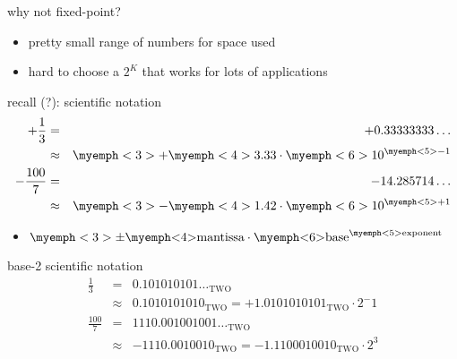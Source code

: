 \begin{frame}{why not fixed-point?}
\begin{itemize}
\item pretty small range of numbers for space used
\item hard to choose a $2^K$ that works for lots of applications
\end{itemize}
\end{frame}

\begin{frame}{recall (?): scientific notation}
\begin{eqnarray*}
+\frac{1}{3} &=& +0.33333333\ldots \\
            &\approx& \myemph<3>{+}\myemph<4>{3.33}\cdot \myemph<6>{10}^{\myemph<5>{-1}} \\
-\frac{100}{7} &=& -14.285714\ldots \\
            &\approx& \myemph<3>{-}\myemph<4>{1.42}\cdot \myemph<6>{10}^{\myemph<5>{+1}} \\
\end{eqnarray*}
\begin{itemize}
\item<2-> $\myemph<3>{\pm}\text{\myemph<4>{mantissa}} \cdot \text{\myemph<6>{base}}^\text{\myemph<5>{exponent}}$
\end{itemize}
\end{frame}

\begin{frame}{base-2 scientific notation}
\begin{eqnarray*}
\frac{1}{3} &=& 0.101010101\ldots_\text{TWO}  \\\
            &\approx& 0.1010101010_\text{TWO} =  +1.0101010101_\text{TWO} \cdot 2^-1\\
\frac{100}{7} &=& 1110.001001001\ldots_\text{TWO}  \\\
            &\approx& -1110.0010010_\text{TWO} = -1.1100010010_\text{TWO} \cdot 2^3\\
\end{eqnarray*}
\end{frame}


